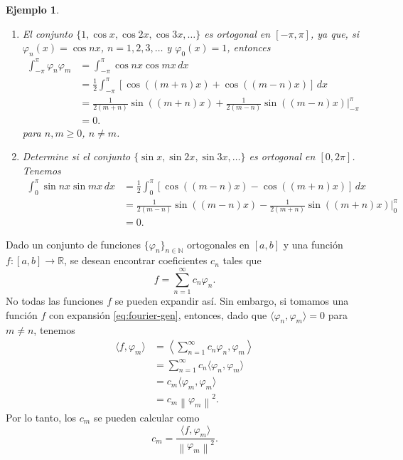 \documentclass[11pt,letterpaper]{report}
\newtheorem{example}[defn]{Ejemplo}
\newcommand\R{\mathbb R}
\newcommand\N{\mathbb N}
\newcommand\norm[1]{\left\|#1\right\|}
\newcommand\<{\langle}
\renewcommand\>{\rangle}
\renewcommand\phi\varphi
\begin{document}
\begin{example}
  \begin{enumerate}
    \item   
    El conjunto $\{1,\cos x,\cos 2x,\cos 3x,\dots\}$ es ortogonal
    en $[-\pi,\pi]$, ya que, si $\phi_n(x)=\cos nx$,
    $n=1,2,3,\dots$ y $\phi_0(x)=1$, entonces
    \begin{align*}
      \int_{-\pi}^\pi \phi_n\phi_m
      &= \int_{-\pi}^\pi \cos nx \cos mx \,dx \\
      &= \frac{1}{2}
        \int_{-\pi}^\pi [\cos((m+n)x) + \cos((m-n)x)] \,dx \\
      &= \frac{1}{2(m+n)}\sin((m+n)x) + \frac{1}{2(m-n)}\sin((m-n)x)
      |_{-\pi}^\pi \\
      &= 0.
    \end{align*}
    para $n,m\geq 0$, $n\neq m$.

    \item Determine si el conjunto $\{\sin x,\sin 2x,\sin
    3x,\dots\}$ es ortogonal en $[0,2\pi]$.
    Tenemos
    \begin{align*}
      \int_0^\pi \sin nx\sin mx \,dx
      &= \frac{1}{2}\int_0^\pi[\cos((m-n)x)-\cos((m+n)x)] \,dx \\
      &= \frac{1}{2(m-n)}\sin((m-n)x)
        - \frac{1}{2(m+n)}\sin((m+n)x) |_0^\pi \\
      &= 0.
    \end{align*}
  \end{enumerate}
\end{example}

Dado un conjunto de funciones $\{\phi_n\}_{n\in\N}$ ortogonales en
$[a,b]$ y una función $f:[a,b]\to\R$,
se desean encontrar coeficientes $c_n$ tales que
\begin{equation}\label{eq:fourier-gen}
  f = \sum_{n=1}^{\infty}c_n\phi_n.
\end{equation}
No todas las funciones $f$ se pueden expandir así.
Sin embargo, si tomamos una función $f$ con expansión
\eqref{eq:fourier-gen}, entonces,
dado que $\<\phi_n,\phi_m\>=0$ para $m\neq n$, tenemos
\begin{align*}
  \<f,\phi_m\>
  &= \left\< \sum_{n=1}^{\infty}c_n\phi_n,\phi_m\right\> \\
  &= \sum_{n=1}^{\infty}c_n\<\phi_n,\phi_m\> \\
  &= c_m\<\phi_m,\phi_m\> \\
  &= c_m\norm{\phi_m}^{2}.
\end{align*}
Por lo tanto, los $c_m$ se pueden calcular como
\[
  c_m = \frac{\<f,\phi_m\>}{\norm{\phi_m}^2}
.\]
\end{document}
